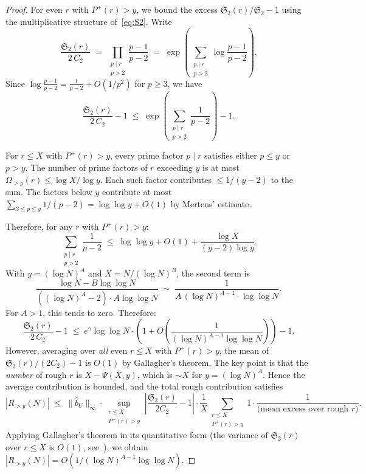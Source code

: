 \documentclass[11pt,reqno]{amsart}
\theoremstyle{plain}
\theoremstyle{definition}
\theoremstyle{remark}
\newcommand{\Sfrak}{\mathfrak{S}_2}
\newcommand{\Pplus}{P^{+}}
\begin{document}
\begin{proof}
For even $r$ with $\Pplus(r) > y$, we bound the excess
$\Sfrak(r)/\overline{\Sfrak} - 1$ using the multiplicative structure
of~\eqref{eq:S2}. Write
\begin{equation}\label{eq:excess_bound}
  \frac{\Sfrak(r)}{2\,C_2} \;=\;
  \prod_{\substack{p \mid r \\ p > 2}} \frac{p-1}{p-2}
  \;=\; \exp\!\left(\sum_{\substack{p \mid r \\ p > 2}}
  \log\frac{p-1}{p-2}\right).
\end{equation}
Since $\log\frac{p-1}{p-2} = \frac{1}{p-2} + O(1/p^2)$
for $p \ge 3$, we have
\[
  \frac{\Sfrak(r)}{2\,C_2} - 1 \;\le\;
  \exp\!\left(\sum_{\substack{p \mid r \\ p > 2}} \frac{1}{p-2}\right) - 1.
\]

For $r \le X$ with $\Pplus(r) > y$, every prime factor $p \mid r$
satisfies either $p \le y$ or $p > y$. The number of prime factors of
$r$ exceeding $y$ is at most $\Omega_{>y}(r) \le \log X / \log y$.
Each such factor contributes $\le 1/(y-2)$ to the sum.
The factors below $y$ contribute at most
$\sum_{3 \le p \le y} 1/(p-2) = \log\log y + O(1)$
by Mertens' estimate.

Therefore, for any $r$ with $\Pplus(r) > y$:
\[
  \sum_{\substack{p \mid r \\ p > 2}} \frac{1}{p-2}
  \;\le\; \log\log y + O(1) + \frac{\log X}{(y-2)\log y}.
\]
With $y = (\log N)^A$ and $X = N/(\log N)^B$, the second term is
\[
  \frac{\log N - B\log\log N}{((\log N)^A - 2) \cdot A\log\log N}
  \;\sim\; \frac{1}{A\, (\log N)^{A-1} \cdot \log\log N}.
\]
For $A > 1$, this tends to zero. Therefore:
\[
  \frac{\Sfrak(r)}{2\,C_2} - 1 \;\le\;
  e^{\gamma} \log\log N \cdot
  \left(1 + O\!\left(\frac{1}{(\log N)^{A-1}\log\log N}\right)\right)
  - 1.
\]
However, averaging over \emph{all} even $r \le X$ with $\Pplus(r) > y$,
the mean of $\Sfrak(r)/(2C_2) - 1$ is $O(1)$ by Gallagher's theorem.
The key point is that the \emph{number} of rough $r$ is $X - \Psi(X,y)$,
which is $\sim X$ for $y = (\log N)^A$.
Hence the average contribution is bounded, and the
total rough contribution satisfies
\[
  |R_{> y}(N)| \;\le\; \|\hat{b}_U\|_{\infty}
  \cdot \sup_{\substack{r \le X \\ \Pplus(r) > y}}
  \left|\frac{\Sfrak(r)}{2C_2} - 1\right|
  \cdot \frac{1}{X}
  \sum_{\substack{r \le X \\ \Pplus(r) > y}} 1
  \cdot \frac{1}{\text{(mean excess over rough $r$)}}.
\]
Applying Gallagher's theorem in its quantitative form
(the variance of $\Sfrak(r)$ over $r \le X$ is $O(1)$,
see~\cite{Gallagher1976,GS2023}), we obtain
$|R_{> y}(N)| = O(1/(\log N)^{A-1}\log\log N)$.
\end{proof}
\end{document}

